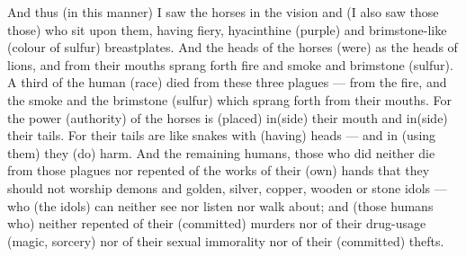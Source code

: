 \begin{pages}
\begin{Leftside}
		\pend
		\pstart
		And thus (in this manner) I saw the horses in the vision and (I also saw those those) who sit upon them, having fiery, hyacinthine (purple) and brimstone-like (colour of sulfur) breastplates. And the heads of the horses (were) as the heads of lions, and from their mouths sprang forth fire and smoke and brimstone (sulfur).
		\pend 
		\pstart
		A third of the human (race) died from these three plagues — from the fire, and the smoke and the brimstone (sulfur) which sprang forth from their mouths. For the power (authority) of the horses is (placed) in(side) their mouth and in(side) their tails. For their tails are like snakes with (having) heads — and in (using them) they (do) harm. 
		\pend
		\pstart
		And the remaining humans, those who did neither die from those plagues nor repented of the works of their (own) hands that they should not worship demons and golden, silver, copper, wooden or stone idols — who (the idols) can neither see nor listen nor walk about; and (those humans who) neither repented of their (committed) murders nor of their drug-usage (magic, sorcery) nor of their sexual immorality nor of their (committed) thefts. 
		\pend
        \endnumbering
    \end{Leftside}

\end{pages} 
\Pages

